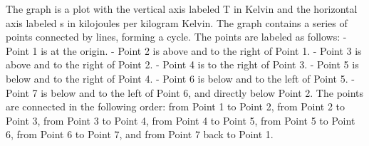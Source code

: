 The graph is a plot with the vertical axis labeled T in Kelvin and the horizontal axis labeled s in kilojoules per kilogram Kelvin. The graph contains a series of points connected by lines, forming a cycle. The points are labeled as follows:
- Point 1 is at the origin.
- Point 2 is above and to the right of Point 1.
- Point 3 is above and to the right of Point 2.
- Point 4 is to the right of Point 3.
- Point 5 is below and to the right of Point 4.
- Point 6 is below and to the left of Point 5.
- Point 7 is below and to the left of Point 6, and directly below Point 2.
The points are connected in the following order: from Point 1 to Point 2, from Point 2 to Point 3, from Point 3 to Point 4, from Point 4 to Point 5, from Point 5 to Point 6, from Point 6 to Point 7, and from Point 7 back to Point 1.